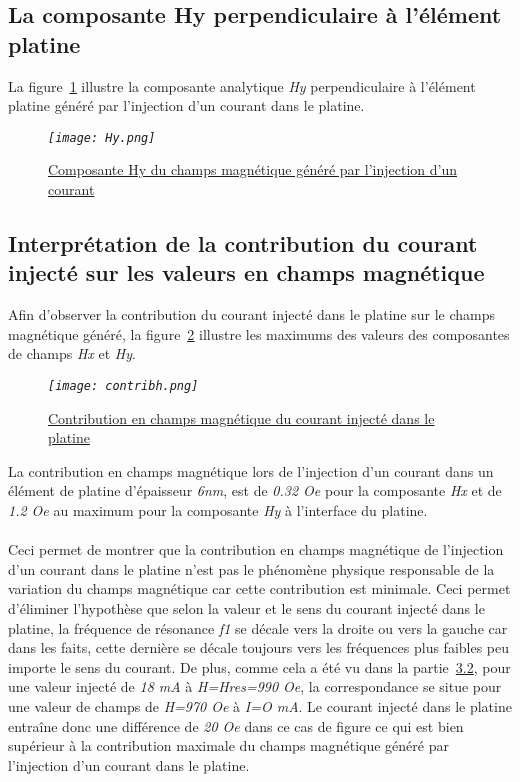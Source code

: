 \documentclass[12pt,fleqn]{book} %
\begin{document}
\subsection{La composante Hy perpendiculaire à l'élément platine}
\noindent La figure~\underline{\color{blue}\ref{hy}} illustre la composante analytique \emph{Hy} perpendiculaire à l'élément platine généré par l'injection d'un courant dans le platine.
\begin{figure}[H]
	\centering
	\itshape
	\texttt{[image: Hy.png]}
	\caption{\label{hy} \underline{Composante Hy du champs magnétique généré par l'injection d'un courant}}
\end{figure}
\subsection{Interprétation de la contribution du courant injecté sur les valeurs en champs magnétique }
\noindent Afin d'observer la contribution du courant injecté dans le platine sur le champs magnétique généré, la figure~\underline{\color{blue}\ref{contribh}} illustre les maximums des valeurs des composantes de champs \emph{Hx} et \emph{Hy}.
\begin{figure}[H]
	\centering
	\itshape
	\texttt{[image: contribh.png]}
	\caption{\label{contribh} \underline{Contribution en champs magnétique du courant injecté dans le platine}}
\end{figure}
\noindent La contribution en champs magnétique lors de l'injection d'un courant dans un élément de platine d'épaisseur \emph{6nm}, est de \emph{0.32 Oe} pour la composante \emph{Hx} et de \emph{1.2 Oe} au maximum pour la composante \emph{Hy} à l'interface du platine.
~\\\\Ceci permet de montrer que la contribution en champs magnétique de l'injection d'un courant dans le platine n'est pas le phénomène physique responsable de la variation du champs magnétique car cette contribution est minimale. Ceci permet d'éliminer l'hypothèse que selon la valeur et le sens du courant injecté dans le platine, la fréquence de résonance \emph{f1} se décale vers la droite ou vers la gauche car dans les faits, cette dernière se décale toujours vers les fréquences plus faibles peu importe le sens du courant.
De plus, comme cela a été vu dans la partie~\underline{\color{blue}3.2}, pour une valeur injecté de \emph{18 mA} à \emph{H=Hres=990 Oe}, la correspondance se situe pour une valeur de champs de \emph{H=970 Oe} à \emph{I=O mA}. Le courant injecté dans le platine entraîne donc une différence de \emph{20 Oe} dans ce cas de figure ce qui est bien supérieur à la contribution maximale du champs magnétique généré par l'injection d'un courant dans le platine.
\end{document}
